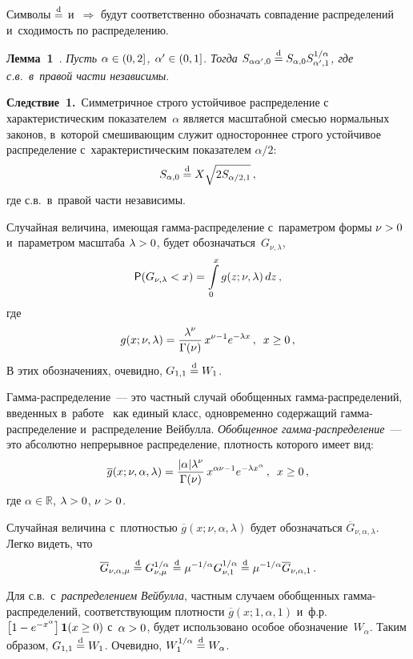 \begin{multicols}{2}
Символы $\stackrel{\mathrm{d}}{=}$ и~$\Longrightarrow$ будут соответственно обозначать
совпадение распределений и~сходимость по распределению.

\smallskip

\noindent
\textbf{Лемма~1}~\cite[теорема~3.3.1]{Zolotarev1983}. \textit{Пусть
$\alpha\hm\in(0,2]$, $\alpha'\hm\in(0,1]$. Тогда $S_{\alpha\alpha',0}\hm\eqd
S_{\alpha,0}S_{\alpha',1}^{1/\alpha}$, где с.в.\ в~правой части
независимы}.

\smallskip

\noindent
\textbf{Следствие~1.}\ Симметричное строго устойчивое распределение
с характеристическим показателем~$\alpha$ является масштабной смесью
нормальных законов, в~которой смешивающим служит одностороннее
строго устойчивое распределение с~характеристическим показателем
$\alpha/2$:
\begin{equation}
S_{\alpha,0}\stackrel{\mathrm{d}}{=} X\sqrt{2S_{\alpha/2,1}}\,, 
\label{e6-kgz}
\end{equation}
где с.в.\ в~правой части независимы.

\smallskip

Случайная величина, име\-ющая гам\-ма-рас\-пре\-де\-ле\-ние с~параметром формы $\nu\hm>0$ 
и~параметром масштаба $\lambda\hm>0$, будет обозначаться~$G_{\nu,\lambda}$,
\begin{equation*}
{\sf P}(G_{\nu,\lambda}<x)=\int\limits_{0}^{x}g(z;\nu,\lambda)\,dz\,,
\end{equation*}
где
$$
g(x;\nu,\lambda)=\displaystyle\frac{\displaystyle \lambda^\nu\mathstrut}{\displaystyle \Gamma(\nu)\mathstrut}\,x^{\nu-1}e^{-\lambda
x}\,,\enskip x\ge0\,,
$$
В этих обозначениях, очевидно, $G_{1,1}\hm\eqd W_1$.

Гамма-распределение~--- это частный случай обобщенных
гамма-распределений, введенных в~работе~\cite{Stacy1962} как единый
класс, одновременно содержащий гам\-ма-рас\-пре\-де\-ле\-ние и~распределение
Вейбулла. \textit{Обобщенное гам\-ма-рас\-пре\-де\-ле\-ние}~--- это абсолютно
непрерывное распределение, плотность которого имеет вид:
$$
\overline{g}(x;\nu,\alpha,\lambda)=\displaystyle\frac{\displaystyle |\alpha|\lambda^\nu\mathstrut}{\displaystyle \Gamma(\nu)\mathstrut}\,x^{\alpha
\nu-1}e^{-\lambda x^{\alpha}}\,,\enskip x\ge0\,,
$$
где $\alpha\in\mathbb{R}$, $\lambda\hm>0$, $\nu\hm>0$.

Случайная величина с~плот\-ностью $\overline{g}(x;\nu,\alpha,\lambda)$ будет
обозначаться $\overline{G}_{\nu,\alpha,\lambda}$. Легко видеть, что
$$
\overline{G}_{\nu,\alpha,\mu}\stackrel{\mathrm{d}}{=} G_{\nu,\mu}^{1/\alpha}\stackrel{\mathrm{d}}{=}
\mu^{-1/\alpha}G_{\nu,1}^{1/\alpha}
\stackrel{\mathrm{d}}{=}\mu^{-1/\alpha}\overline{G}_{\nu,\alpha,1}\,.
$$

Для с.в.\ с~\textit{распределением Вейбулла}, частным случаем
обобщенных гам\-ма-рас\-пре\-де\-ле\-ний, соответствующим плотности
$\overline{g}(x;1,\alpha,1)$ и~ф.р.\
$\left[1\hm-e^{-x^{\alpha}}\right]{\bf 1}(x\hm\ge0)$ с~$\alpha\hm>0$, будет
использовано особое обозначение~$W_{\alpha}$. Таким образом,
$G_{1,1}\hm\eqd W_1$. Очевидно, $W_1^{1/\alpha}\hm\eqd W_{\alpha}$.


\end{multicols}
